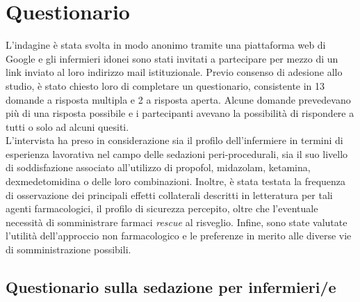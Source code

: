 \section{Questionario}

L'indagine è stata svolta in modo anonimo tramite una piattaforma web di Google e gli infermieri idonei sono stati invitati a partecipare per mezzo di un link inviato al loro indirizzo mail istituzionale. Previo consenso di adesione allo studio, è stato chiesto loro di completare un questionario, consistente in 13 domande a risposta multipla e 2 a risposta aperta. Alcune domande prevedevano più di una risposta possibile e i partecipanti avevano la possibilità di rispondere a tutti o solo ad alcuni quesiti. 
\\L'intervista ha preso in considerazione sia il profilo dell'infermiere in termini di esperienza lavorativa nel campo delle sedazioni peri-procedurali, sia il suo livello di soddisfazione associato all'utilizzo di propofol, midazolam, ketamina, dexmedetomidina o delle loro combinazioni. Inoltre, è stata testata la frequenza di osservazione dei principali effetti collaterali descritti in letteratura per tali agenti farmacologici, il profilo di sicurezza percepito, oltre che l'eventuale necessità di somministrare farmaci \emph{rescue} al risveglio. Infine, sono state valutate l'utilità dell'approccio non farmacologico e le preferenze in merito alle diverse vie di somministrazione possibili. 

\bigskip

\subsection*{Questionario sulla sedazione per infermieri/e}


